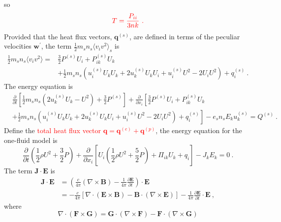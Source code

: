 \documentclass[12pt,a4paper]{article}
\renewcommand{\vec}[1]{\boldsymbol{#1}}
\begin{document}
so
\begin{equation}
\color{red} T = \frac{P_{ii}}{3nk} ~.
\end{equation}
Provided that the heat flux vectors, $\vec{q}^{(s)}$, are defined in terms of the peculiar velocities $\vec{w}^\prime$,  the term $\frac{1}{2} m_s n_s \langle v_i v^2 \rangle_s$ is
\begin{align}
\nonumber \frac{1}{2} m_s n_s \langle v_i v^2 \rangle =& \frac{3}{2} P^{(s)} U_i +P_{ik}^{(s)} U_k \\
& +\frac{1}{2} m_s n_s \left(u_i^{(s)} U_k U_k +2u_k^{(s)} U_k U_i +u_i^{(s)} U^2 -2U_i U^2 \right) +q_i^{(s)} ~.
\end{align}
The energy equation is 
\begin{align}
\nonumber & \frac{\partial }{\partial t}\left[ \frac{1}{2} m_s n_s(2u_k^{(s)} U_k -U^2) +\frac{3}{2} P^{(s)}\right] +\frac{\partial }{\partial x_i} \left[\frac{3}{2} P^{(s)}U_i +P_{ik}^{(s)}U_k  \right. \\
& \left. + \frac{1}{2} m_s n_s \left(u_i^{(s)} U_kU_k +2u_k^{(s)}U_kU_i +u_i^{(s)} U^2 -2U_i U^2 \right) +q_i^{(s)} \right] -e_sn_s E_k u_k^{(s)} = Q^{(s)} ~.
\end{align}
Define the \textcolor{red}{total heat flux vector $\vec{q} = \vec{q}^{(e)} + \vec{q}^{(p)}$}, the energy equation for the one-fluid model is
\begin{equation}
\frac{\partial }{\partial t}\left( \frac{1}{2} \rho U^2 +\frac{3}{2} P\right) +\frac{\partial }{\partial x_i} \left[U_i\left( \frac{1}{2}\rho U^2 +\frac{5}{2} P \right)  + \Pi_{ik}U_k +q_i \right] -J_k E_k = 0 ~.
\label{one_energy}
\end{equation}
The term $\vec{J}\cdot \vec{E}$ is
\begin{align*}
\vec{J}\cdot\vec{E} &= \left( \frac{c}{4\pi} (\nabla \times \vec{B}) -\frac{1}{4\pi} \frac{\partial \vec{E} }{\partial t} \right) \cdot \vec{E} \\
&= -\frac{c}{4\pi} \left[\nabla \cdot (\vec{E} \times \vec{B}) -\vec{B}\cdot (\nabla \times \vec{E}) \right] -\frac{1}{4\pi} \frac{\partial \vec{E} }{\partial t}\cdot \vec{E} ~,
\end{align*}
where
\begin{equation*}
\nabla \cdot (\vec{F} \times \vec{G} ) = \vec{G} \cdot (\nabla \times \vec{F}) -\vec{F} \cdot (\nabla \times \vec{G})
\end{equation*}
\end{document}
